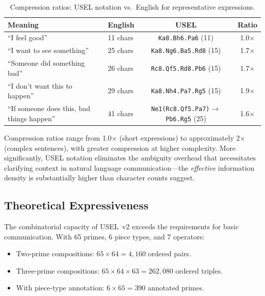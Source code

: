 \documentclass[11pt,a4paper]{article}
\begin{document}
\begin{table}[h!]
\centering
\caption{Compression ratios: USEL notation vs.\ English for representative expressions.}
\label{tab:compression}
\small
\begin{tabular}{llcc}
\toprule
\textbf{Meaning} & \textbf{English} & \textbf{USEL} & \textbf{Ratio} \\
\midrule
``I feel good'' & 11 chars & \texttt{Ka8.Bh6.Pa6} (11) & 1.0$\times$ \\
``I want to see something'' & 25 chars & \texttt{Ka8.Ng6.Ba5.Rd8} (15) & 1.7$\times$ \\
``Someone did something bad'' & 26 chars & \texttt{Rc8.Qf5.Rd8.Pb6} (15) & 1.7$\times$ \\
``I don't want this to happen'' & 29 chars & \texttt{Ka8.Nh4.Pa7.Rg5} (15) & 1.9$\times$ \\
``If someone does this, bad things happen'' & 41 chars & \texttt{Ne1(Rc8.Qf5.Pa7)$\rightarrow$Pb6.Rg5} (25) & 1.6$\times$ \\
\bottomrule
\end{tabular}
\end{table}

Compression ratios range from 1.0$\times$ (short expressions) to approximately 2$\times$ (complex sentences), with greater compression at higher complexity. More significantly, USEL notation eliminates the ambiguity overhead that necessitates clarifying context in natural language communication---the \emph{effective} information density is substantially higher than character counts suggest.

\subsection{Theoretical Expressiveness}
\label{sec:expressiveness}

The combinatorial capacity of USEL~v2 exceeds the requirements for basic communication. With 65 primes, 6 piece types, and 7 operators:

\begin{itemize}[nosep]
    \item Two-prime compositions: $65 \times 64 = 4{,}160$ ordered pairs.
    \item Three-prime compositions: $65 \times 64 \times 63 = 262{,}080$ ordered triples.
    \item With piece-type annotation: $6 \times 65 = 390$ annotated primes.
\end{itemize}
\end{document}
